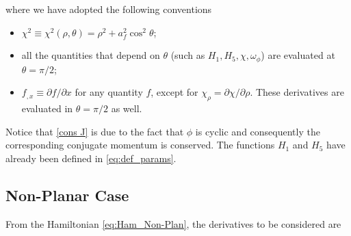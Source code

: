 \documentclass[prd,aps,a4paper,eqsecnum,nofootinbib,floatfix,twocolumn,superscriptaddress]{revtex4-2}
\begin{document}
where we have adopted the following conventions
\begin{itemize}
    \item  $\chi^2 \equiv \chi^2(\rho,\theta) = \rho^2 + a_f^2 \cos^2 \theta$;
    \item  all the quantities that depend on $\theta$ (such as $H_1, H_5, \chi, \omega_\phi$) are evaluated at $\theta = \pi/2$;
    \item $f_{,x} \equiv \partial f / \partial x$ for any quantity $f$, except for $\chi_\rho = \partial \chi / \partial \rho$. These derivatives are evaluated in $\theta = \pi/2$ as well.
\end{itemize}
Notice that \eqref{cons J} is due to the fact that $\phi$ is cyclic and consequently the corresponding conjugate momentum is conserved. The functions $H_1$ and $H_5$ have already been defined in  \eqref{eq:def_params}.

\subsection{\label{app:non-planar}Non-Planar Case}
From the  Hamiltonian \eqref{eq:Ham_Non-Plan}, the derivatives to be considered are
\end{document}
